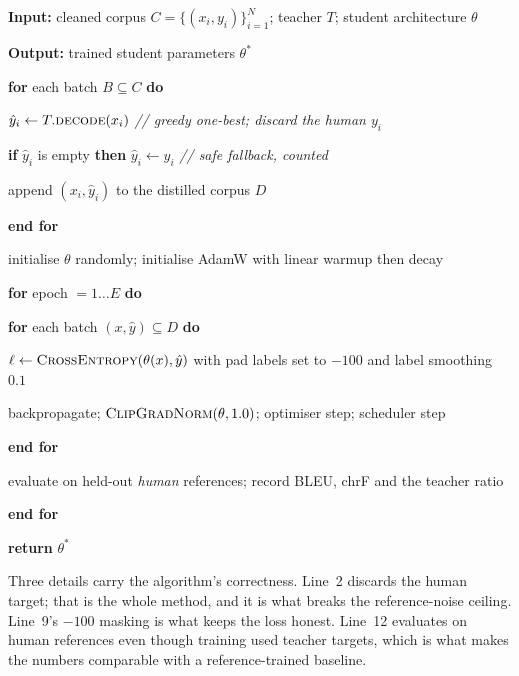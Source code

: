 \noindent \textbf{Input:} cleaned corpus $C = \{(x_i, y_i)\}_{i=1}^{N}$; teacher $T$; student architecture $\theta$\par\nopagebreak
\noindent \textbf{Output:} trained student parameters $\theta^{*}$\par\nopagebreak
\vspace{2pt}
\begin{algsteps}
\item \textbf{for} each batch $B \subseteq C$ \textbf{do}
\item \algind $\hat{y}_i \leftarrow T.\textsc{decode}(x_i)$ \quad \textit{// greedy one-best; discard the human $y_i$}
\item \algind \textbf{if} $\hat{y}_i$ is empty \textbf{then} $\hat{y}_i \leftarrow y_i$ \quad \textit{// safe fallback, counted}
\item \algind append $(x_i, \hat{y}_i)$ to the distilled corpus $D$
\item \textbf{end for}
\item initialise $\theta$ randomly; initialise AdamW with linear warmup then decay
\item \textbf{for} epoch $= 1 \ldots E$ \textbf{do}
\item \algind \textbf{for} each batch $(x, \hat{y}) \subseteq D$ \textbf{do}
\item \algind \algind $\ell \leftarrow \textsc{CrossEntropy}(\theta(x), \hat{y})$ with pad labels set to $-100$ and label smoothing $0.1$
\item \algind \algind backpropagate; $\textsc{ClipGradNorm}(\theta, 1.0)$; optimiser step; scheduler step
\item \algind \textbf{end for}
\item \algind evaluate on held-out \emph{human} references; record BLEU, chrF and the teacher ratio
\item \textbf{end for}
\item \textbf{return} $\theta^{*}$
\end{algsteps}

Three details carry the algorithm's correctness. Line~2 discards the human
target; that is the whole method, and it is what breaks the reference-noise
ceiling. Line~9's $-100$ masking is what keeps the loss honest. Line~12
evaluates on human references even though training used teacher targets, which
is what makes the numbers comparable with a reference-trained baseline.

